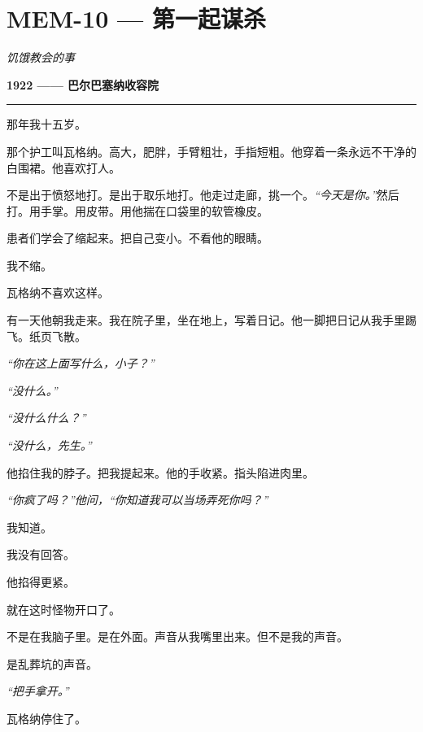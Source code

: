 \section*{\textbf{MEM-10} --- 第一起谋杀}

\noindent \textit{饥饿教会的事}

\noindent \textbf{1922 —— 巴尔巴塞纳收容院}

\vspace{0.5em}\noindent\rule{\textwidth}{0.5pt}\vspace{0.5em}

\noindent 那年我十五岁。

\noindent 那个护工叫瓦格纳。高大，肥胖，手臂粗壮，手指短粗。他穿着一条永远不干净的白围裙。他喜欢打人。

\noindent 不是出于愤怒地打。是出于取乐地打。他走过走廊，挑一个。\textit{“今天是你。”}然后打。用手掌。用皮带。用他揣在口袋里的软管橡皮。

\noindent 患者们学会了缩起来。把自己变小。不看他的眼睛。

\noindent 我不缩。

\noindent 瓦格纳不喜欢这样。

\noindent 有一天他朝我走来。我在院子里，坐在地上，写着日记。他一脚把日记从我手里踢飞。纸页飞散。

\noindent \textit{“你在这上面写什么，小子？”}

\noindent \textit{“没什么。”}

\noindent \textit{“没什么什么？”}

\noindent \textit{“没什么，先生。”}

\noindent 他掐住我的脖子。把我提起来。他的手收紧。指头陷进肉里。

\noindent \textit{“你疯了吗？”他问，“你知道我可以当场弄死你吗？”}

\noindent 我知道。

\noindent 我没有回答。

\noindent 他掐得更紧。

\noindent 就在这时怪物开口了。

\noindent 不是在我脑子里。是在外面。声音从我嘴里出来。但不是我的声音。

\noindent 是乱葬坑的声音。

\noindent \textit{“把手拿开。”}

\noindent 瓦格纳停住了。

